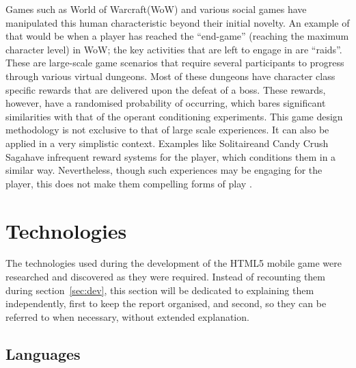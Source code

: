 \documentclass[final]{cmpreport}
\begin{document}
Games such as World of Warcraft\footnotemark (WoW) and various social games have manipulated this human characteristic beyond their initial novelty. An example of that would be when a player has reached the ``end-game'' (reaching the maximum character level) in WoW; the key activities that are left to engage in are ``raids''. These are large-scale game scenarios that require several participants to progress through various virtual dungeons. Most of these dungeons have character class specific rewards that are delivered upon the defeat of a boss. These rewards, however, have a randomised probability of occurring, which bares significant similarities with that of the operant conditioning experiments. This game design methodology is not exclusive to that of large scale experiences. It can also be applied in a very simplistic context. Examples like Solitaire\footnotemark and Candy Crush Saga\footnotemark have infrequent reward systems for the player, which conditions them in a similar way. Nevertheless, though such experiences may be engaging for the player, this does not make them compelling forms of play \citep{ExtraCredits}.


\section{Technologies}
The technologies used during the development of the HTML5 mobile game were researched and discovered as they were required. Instead of recounting them during section~\ref{sec:dev}, this section will be dedicated to explaining them independently, first to keep the report organised, and second, so they can be referred to when necessary, without extended explanation.

\subsection{Languages}
\end{document}
